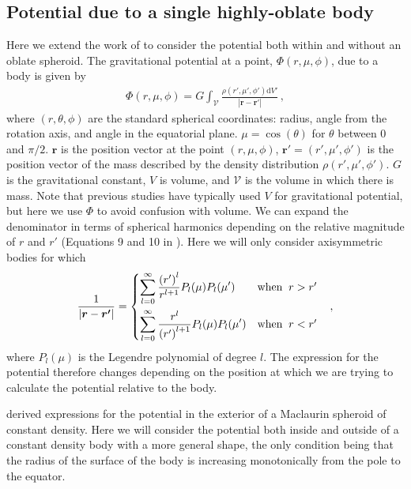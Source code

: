 \documentclass[11pt, oneside]{article}   	%
\renewcommand{\vec}[1]{\bm{#1}}
\begin{document}
\subsection{Potential due to a single highly-oblate body}

Here we extend the work of \cite{Kong2013} to consider the potential both within and without an oblate spheroid.
The gravitational potential at a point, $\Phi(r, \mu, \phi)$, due to a body is given by
%
\begin{align}
\Phi(r, \mu, \phi) = G \int_{\mathcal{V}} \frac{\rho(r', \mu', \phi') \mathrm{d}V' }{ | \vec{r} - \vec{r}' |} \, ,
\end{align}
%
where $(r, \theta, \phi)$ are the standard spherical coordinates: radius, angle from the rotation axis, and angle in the equatorial plane. $\mu=\cos{(\theta)}$ for $\theta$ between 0 and $\pi/2$. $\vec{r}$ is the position vector at the point $(r, \mu, \phi)$,   $\vec{r}'=(r', \mu', \phi')$ is the position vector of the mass described by the density distribution $\rho(r', \mu', \phi')$.
$G$ is the gravitational constant, $V$ is volume, and $\mathcal{V}$ is the volume in which there is mass. Note that previous studies have typically used $V$ for gravitational potential, but here we use $\Phi$ to avoid confusion with volume.
We can expand the denominator in terms of spherical harmonics depending on the relative magnitude of $r$ and $r'$ (Equations 9 and 10 in \cite{Kong2013}). Here we will only consider axisymmetric bodies for which 
%
\begin{equation}
 \frac{1}{ | \vec{r} - \vec{r'} |} = \begin{dcases*}
        \sum_{l=0}^{\infty}  \frac{ \left(r' \right )^l}{r^{l+1}} P_l(\mu) P_l(\mu')   & when  $\: r > r' $\\
	\sum_{l=0}^{\infty}  \frac{ r^l}{\left ( r' \right )^{l+1}} P_l(\mu) P_l(\mu')   &  when $\: r < r' $	
        \end{dcases*} \;\; ,
\end{equation}
%
where $P_l(\mu)$ is the Legendre polynomial of degree $l$.
The expression for the potential therefore changes depending on the position at which we are trying to calculate the potential relative to the body. 

\cite{Kong2013} derived expressions for the potential in the exterior of a Maclaurin spheroid of constant density. 
Here we will consider the potential both inside and outside of a constant density body with a more general shape, the only condition being that the radius of the surface of the body is increasing monotonically from the pole to the equator.  
\end{document}
